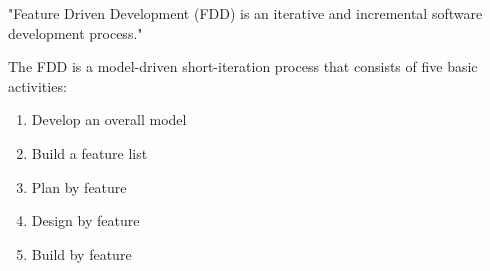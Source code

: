 "Feature Driven Development (FDD) is an iterative and incremental software development process." \cite{fdd}

    The FDD is a model-driven short-iteration process that consists of five basic activities:
    
    \begin{enumerate}
        \item Develop an overall model
        \item Build a feature list
        \item Plan by feature
        \item Design by feature
        \item Build by feature
    \end{enumerate}

